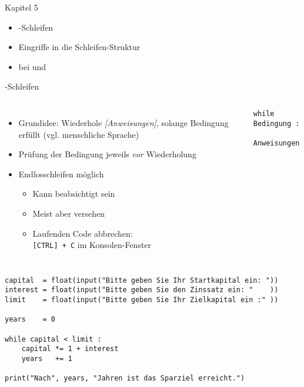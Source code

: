 
\begin{frame}[fragile]{Kapitel 5}
%
\begin{itemize}
\item {}-Schleifen
\item Eingriffe in die Schleifen-Struktur
\item {} bei  und 
\end{itemize}
%
\end{frame}


\begin{frame}[fragile]{-Schleifen}
%
\begin{columns}[T]
\begin{itemize}
\item Grundidee: Wiederhole \emph{[Anweisungen]}, solange Bedingung erfüllt (vgl. menschliche Sprache)
\item Prüfung der Bedingung jeweils \emph{vor} Wiederholung
\item Endlosschleifen möglich
	\begin{itemize}
	\item Kann beabsichtigt sein
	\item Meist aber versehen
	\item Laufenden Code abbrechen:\\
		\texttt{[CTRL] + C} im Konsolen-Fenster
	\end{itemize}
\end{itemize}
%
\begin{codebox}
\begin{verbatim}
while Bedingung :
    Anweisungen
\end{verbatim}
\end{codebox}
\end{columns}
%
\end{frame}


\begin{frame}[fragile]
%
\begin{codebox}
\begin{verbatim}
capital  = float(input("Bitte geben Sie Ihr Startkapital ein: "))
interest = float(input("Bitte geben Sie den Zinssatz ein: "    ))
limit    = float(input("Bitte geben Sie Ihr Zielkapital ein :" ))

years    = 0

while capital < limit :
    capital *= 1 + interest
    years   += 1

print("Nach", years, "Jahren ist das Sparziel erreicht.")
\end{verbatim}
\end{codebox}
%
\end{frame}

